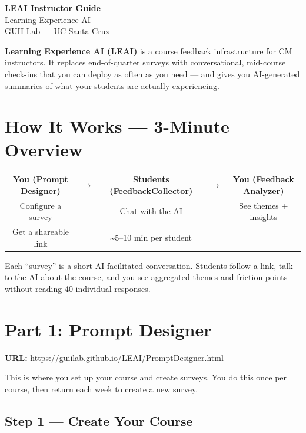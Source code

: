 \documentclass[11pt, letterpaper]{article}
\begin{document}
\begin{center}
    {\LARGE\bfseries LEAI Instructor Guide}\\[0.5em]
    {\large Learning Experience AI}\\[1em]
    {\normalsize GUII Lab — UC Santa Cruz}
\end{center}

\vspace{1em}

\textbf{Learning Experience AI (LEAI)} is a course feedback infrastructure for CM instructors. It replaces end-of-quarter surveys with conversational, mid-course check-ins that you can deploy as often as you need --- and gives you AI-generated summaries of what your students are actually experiencing.

\section{How It Works --- 3-Minute Overview}

\begin{center}
\begin{tabular}{ccccc}
\textbf{You (Prompt Designer)} & $\rightarrow$ & \textbf{Students (FeedbackCollector)} & $\rightarrow$ & \textbf{You (Feedback Analyzer)} \\
Configure a survey & & Chat with the AI & & See themes + insights \\
Get a shareable link & & \textasciitilde5--10 min per student & & \\
\end{tabular}
\end{center}

Each ``survey'' is a short AI-facilitated conversation. Students follow a link, talk to the AI about the course, and you see aggregated themes and friction points --- without reading 40 individual responses.

\section{Part 1: Prompt Designer}

\textbf{URL:} \url{https://guiilab.github.io/LEAI/PromptDesigner.html}

This is where you set up your course and create surveys. You do this once per course, then return each week to create a new survey.

\subsection{Step 1 --- Create Your Course}
\end{document}
